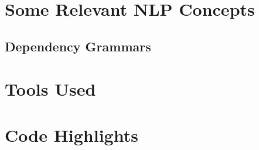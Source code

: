\documentclass[11pt]{article}
\begin{document}
\appendix

\section{Some Relevant NLP Concepts}

\subsection{Dependency Grammars}

\section{Tools Used}

\section{Code Highlights}


\pagebreak

  
\end{document}
